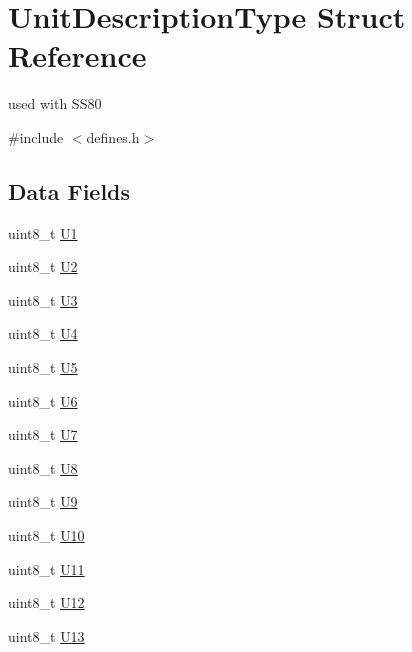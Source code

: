 \hypertarget{structUnitDescriptionType}{}\section{Unit\+Description\+Type Struct Reference}
\label{structUnitDescriptionType}


used with S\+S80  




{\ttfamily \#include $<$defines.\+h$>$}

\subsection*{Data Fields}
\begin{DoxyCompactItemize}
\item 
uint8\+\_\+t \hyperlink{structUnitDescriptionType_a3752aa69edf4c75a4d7a00cead8074a4}{U1}
\item 
uint8\+\_\+t \hyperlink{structUnitDescriptionType_ac6fad13d43afdf94c34b6f3a304a7005}{U2}
\item 
uint8\+\_\+t \hyperlink{structUnitDescriptionType_ab3e64923796c7974898273319bc0356a}{U3}
\item 
uint8\+\_\+t \hyperlink{structUnitDescriptionType_af67d7027e3b93c0d1c6c9e316c31da52}{U4}
\item 
uint8\+\_\+t \hyperlink{structUnitDescriptionType_ab11845623074981c46cbe7af4a5964cd}{U5}
\item 
uint8\+\_\+t \hyperlink{structUnitDescriptionType_a8c7c9b56c879d736a289183fcee17b84}{U6}
\item 
uint8\+\_\+t \hyperlink{structUnitDescriptionType_a9b90dfa70ea1e381a0ea6032ca804ad6}{U7}
\item 
uint8\+\_\+t \hyperlink{structUnitDescriptionType_adea079c655e18cac88ad05a8243f22f8}{U8}
\item 
uint8\+\_\+t \hyperlink{structUnitDescriptionType_a23817cabba1909bcf5a0732ed5da1351}{U9}
\item 
uint8\+\_\+t \hyperlink{structUnitDescriptionType_a2751eba36a1207fbeed39f8c1b99dd17}{U10}
\item 
uint8\+\_\+t \hyperlink{structUnitDescriptionType_a73d351d321ae6bbcd5ad8c14c96ad0a8}{U11}
\item 
uint8\+\_\+t \hyperlink{structUnitDescriptionType_a31d9700085a4dcf3e0d2298e8c877f5f}{U12}
\item 
uint8\+\_\+t \hyperlink{structUnitDescriptionType_a686a531e040eca159c41bba7705d8963}{U13}
\item 

\end{DoxyCompactItemize}
